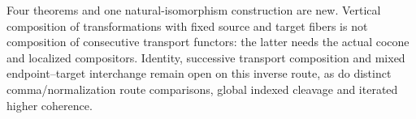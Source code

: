 \documentclass{article}
\begin{document}
Four theorems and one natural-isomorphism construction are new. Vertical composition of transformations with fixed source and target fibers is not composition of consecutive transport functors: the latter needs the actual cocone and localized compositors. Identity, successive transport composition and mixed endpoint--target interchange remain open on this inverse route, as do distinct comma/normalization route comparisons, global indexed cleavage and iterated higher coherence.
\end{document}
